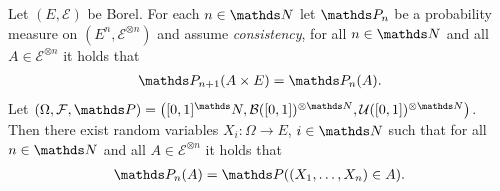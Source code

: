\begin{thm}
Let $(E,\mathcal{E})$ be Borel.
For each $n \in \N$ let $\Prob_n$ be a probability measure on $(E^n,\mathcal{E}^{\otimes n})$ and assume \emph{consistency}, \ie for all
$n \in \N$ and all $A \in \mathcal{E}^{\otimes n}$ it holds that
\begin{align*}
\Prob_{n+1}(A\times E)=\Prob_n(A).
\end{align*}
Let $(\Omega,\mathcal{F},\Prob)=\left([0,1]^\N,\Borel([0,1])^{\otimes \N},\mathcal{U}([0,1])^{\otimes \N}\right)$.
Then there exist random variables $X_i \colon \Omega \to E$, $i \in \N$ such that for all $n \in \N$ and all $A \in \mathcal{E}^{\otimes n}$ it holds that
\begin{align*}
\Prob_n(A)=\Prob((X_1,\dots,X_n)\in A).
\end{align*}
\end{thm}

